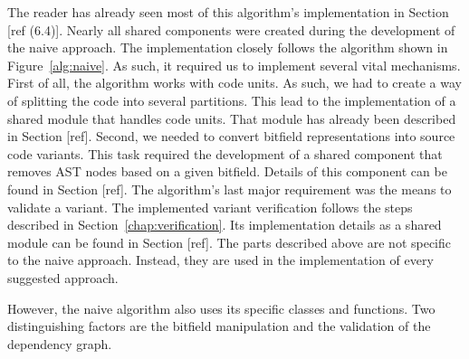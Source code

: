 The reader has already seen most of this algorithm's implementation in 
Section [ref (6.4)]. 
Nearly all shared components were created during the development of 
the naive approach. 
The implementation closely follows the algorithm shown in 
Figure~\ref{alg:naive}. 
As such, it required us to implement several vital mechanisms. 
First of all, the algorithm works with code units. 
As such, we had to create a way of splitting the code into several 
partitions. 
This lead to the implementation of a shared module that handles code units. 
That module has already been described in Section [ref]. 
Second, we needed to convert bitfield representations into source code 
variants. 
This task required the development of a shared component that removes AST 
nodes based on a given bitfield. 
Details of this component can be found in Section [ref]. 
The algorithm's last major requirement was the means to validate a variant. 
The implemented variant verification follows the steps described in 
Section~\ref{chap:verification}. 
Its implementation details as a shared module can be found in Section [ref].
The parts described above are not specific to the naive approach. 
Instead, they are used in the implementation of every suggested approach. 

However, the naive algorithm also uses its specific classes and functions. 
Two distinguishing factors are the bitfield manipulation and the validation 
of the dependency graph.

